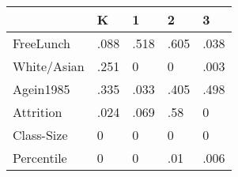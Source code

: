 \begin{table}[htbp]
\begin{tabular}{lllll} \hline \hline
 & K  & 1  & 2  & 3  \\  \hline 
FreeLunch & .088 & .518 & .605 & .038 \\  
White/Asian & .251 & 0 & 0 & .003 \\  
Agein1985 & .335 & .033 & .405 & .498 \\  
Attrition & .024 & .069 & .58 & 0 \\  
Class-Size & 0 & 0 & 0 & 0 \\  
Percentile & 0 & 0 & .01 & .006 \\  
\hline \hline \end{tabular}
\end{table}
